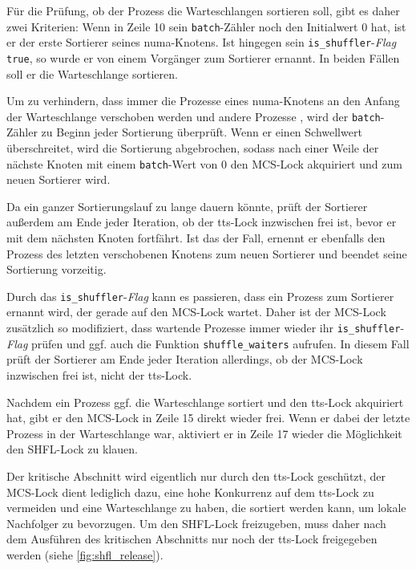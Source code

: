 Für die Prüfung,
ob der Prozess die Warteschlangen sortieren soll,
gibt es daher zwei Kriterien:
Wenn in Zeile 10 sein \texttt{batch}-Zähler noch den Initialwert 0 hat,
ist er der erste Sortierer seines \gls{numa}-Knotens.
Ist hingegen sein \texttt{is\_shuffler}-\textit{Flag} \texttt{true},
so wurde er von einem Vorgänger zum Sortierer ernannt.
In beiden Fällen soll er die Warteschlange sortieren.

Um zu verhindern,
dass immer die Prozesse eines \gls{numa}-Knotens an den Anfang der Warteschlange verschoben werden
und andere Prozesse ,
wird der \texttt{batch}-Zähler zu Beginn jeder Sortierung überprüft.
Wenn er einen Schwellwert überschreitet,
wird die Sortierung abgebrochen,
sodass nach einer Weile
der nächste Knoten mit einem \texttt{batch}-Wert von 0
den MCS-Lock akquiriert
und zum neuen Sortierer wird.

Da ein ganzer Sortierungslauf zu lange dauern könnte,
prüft der Sortierer außerdem am Ende jeder Iteration,
ob der \gls{tts}-Lock inzwischen frei ist,
bevor er mit dem nächsten Knoten fortfährt.
Ist das der Fall,
ernennt er ebenfalls den Prozess des letzten verschobenen Knotens zum neuen Sortierer
und beendet seine Sortierung vorzeitig.

Durch das \texttt{is\_shuffler}-\textit{Flag} kann es passieren,
dass ein Prozess zum Sortierer ernannt wird,
der gerade auf den MCS-Lock wartet.
Daher ist der MCS-Lock zusätzlich so modifiziert,
dass wartende Prozesse immer wieder ihr \texttt{is\_shuffler}-\textit{Flag} prüfen
und ggf. auch die Funktion \texttt{shuffle\_waiters} aufrufen.
In diesem Fall prüft der Sortierer am Ende jeder Iteration allerdings,
ob der MCS-Lock inzwischen frei ist,
nicht der \gls{tts}-Lock.

Nachdem ein Prozess ggf. die Warteschlange sortiert
und den \gls{tts}-Lock akquiriert hat,
gibt er den MCS-Lock in Zeile 15 direkt wieder frei.
Wenn er dabei der letzte Prozess in der Warteschlange war,
aktiviert er in Zeile 17 wieder die Möglichkeit den SHFL-Lock zu klauen.

Der kritische Abschnitt wird eigentlich nur durch den \gls{tts}-Lock geschützt,
der MCS-Lock dient lediglich dazu,
eine hohe Konkurrenz auf dem \gls{tts}-Lock zu vermeiden
und eine Warteschlange zu haben,
die sortiert werden kann,
um lokale Nachfolger zu bevorzugen.
Um den SHFL-Lock freizugeben,
muss daher nach dem Ausführen des kritischen Abschnitts
nur noch der \gls{tts}-Lock freigegeben werden
(siehe \autoref{fig:shfl_release}).

